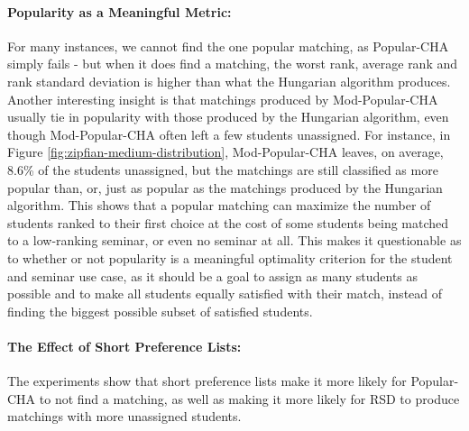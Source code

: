 \paragraph{Popularity as a Meaningful Metric:} For many instances, we cannot find the one popular matching, as Popular-CHA simply fails - but when it does find a matching, the worst rank, average rank and rank standard deviation is higher than what the Hungarian algorithm produces. Another interesting insight is that matchings produced by Mod-Popular-CHA usually tie in popularity with those produced by the Hungarian algorithm, even though Mod-Popular-CHA often left a few students unassigned. For instance, in Figure \ref{fig:zipfian-medium-distribution}, Mod-Popular-CHA leaves, on average, 8.6\% of the students unassigned, but the matchings are still classified as more popular than, or, just as popular as the matchings produced by the Hungarian algorithm. This shows that a popular matching can maximize the number of students ranked to their first choice at the cost of some students being matched to a low-ranking seminar, or even no seminar at all. This makes it questionable as to whether or not popularity is a meaningful optimality criterion for the student and seminar use case, as it should be a goal to assign as many students as possible and to make all students equally satisfied with their match, instead of finding the biggest possible subset of satisfied students.
\paragraph{The Effect of Short Preference Lists:} The experiments show that short preference lists make it more likely for Popular-CHA to not find a matching, as well as making it more likely for RSD to produce matchings with more unassigned students.
